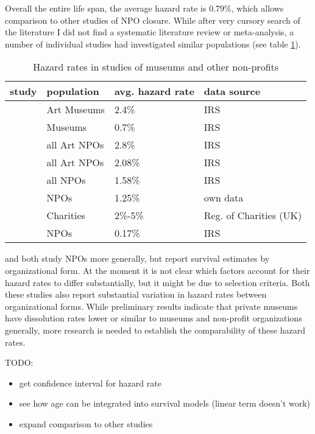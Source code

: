 \documentclass[11pt]{article}
\begin{document}
Overall the entire life span, the average hazard rate is 0.79\%, which allows comparison to other studies of NPO closure.
While after very cursory search of the literature I did not find a systematic literature review or meta-analysis, a number of individual studies had investigated similar populations (see table \ref{tbl:litreview}).

\begin{table}[htbp]
\caption{\label{tbl:litreview}Hazard rates in studies of museums and other non-profits}
\centering
\begin{tabular}{llll}
\hline
study & population & avg. hazard rate & data source\\
\hline
\cite{Hager_2001_vulnerability} & Art Museums & 2.4\% & IRS\\
\cite{Gordon_etal_2013_insolvency} & Museums & 0.7\% & IRS\\
\hline
\cite{Hager_2001_vulnerability} & all Art NPOs & 2.8\% & IRS\\
\cite{Gordon_etal_2013_insolvency} & all Art NPOs & 2.08\% & IRS\\
\cite{Gordon_etal_2013_insolvency} & all NPOs & 1.58\% & IRS\\
\cite{Hager_Galaskiewicz_Larson_2007_liability} & NPOs & 1.25\% & own data\\
\cite{Clifford_2018_reinforcing} & Charities & 2\%-5\% & Reg. of Charities (UK)\\
\cite{Mayer_2022_slimmer} & NPOs & 0.17\% & IRS\\
\hline
\end{tabular}
\end{table}

\textcite{Hager_2001_vulnerability} and \textcite{Gordon_etal_2013_insolvency} both study NPOs more generally, but report survival estimates by organizational form.
At the moment it is not clear which factors account for their hazard rates to differ substantially, but it might be due to selection criteria.
Both these studies also report substantial variation in hazard rates between organizational forms.
While preliminary results indicate that private museums have dissolution rates lower or similar to museums and non-profit organizations generally, more research is needed to establish the comparability of these hazard rates.


\noindent
TODO:
\begin{itemize}
\item get confidence interval for hazard rate
\item see how age can be integrated into survival models (linear term doesn't work)
\item expand comparison to other studies
\end{itemize}
\end{document}
